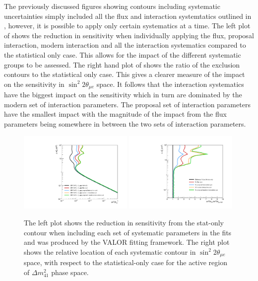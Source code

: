 The previously discussed figures showing contours including systematic uncertainties simply included all the flux and interaction systemtatics outlined in , however, it is possible to apply only certain systematics at a time. The left plot of   shows the reduction in sensitivity when individually applying the flux, proposal interaction, modern interaction and all the interaction systematics compared to the statistical only case. This allows for the impact of the different systematic groups to be assessed. The right hand plot of  shows the ratio of the exclusion contours to the statistical only case. This gives a clearer measure of the impact on the sensitivity in $\sin^2{2\theta_{\mu e}}$ space. It follows that the interaction systematics have the biggest impact on the sensitivity which in turn are dominated by the modern set of interaction parameters. The proposal set of interaction parameters have the smallest impact with the magnitude of the impact from the flux parameters being somewhere in between the two sets of interaction parameters. 

\begin{figure}[h!]
    \centering
    \includegraphics[width = 0.49\textwidth]{figures-chap6/exclusion_contours/nue_app_syst_groups.pdf}
    \includegraphics[width = 0.49\textwidth]{figures-chap6/exclusion_contours/nue_app_syst_groups_ratios.pdf}
    \caption[Impact of the different systematic parameter groups on the \nue appearance sensitivity.]{The left plot shows the reduction in sensitivity from the stat-only contour when including each set of systematic parameters in the fits and was produced by the VALOR fitting framework. The right plot shows the relative location of each systematic contour in $\sin^{2}2\theta_{\mu e}$ space, with respect to the statistical-only case for the active region of $\Delta m_{41}^{2}$ phase space.}
    \label{fig:nue_app_syst_group_sensitivities}
\end{figure}

